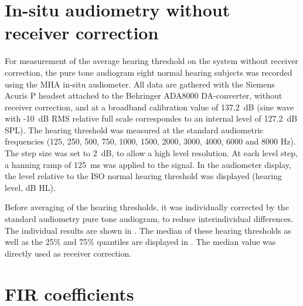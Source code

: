 \documentclass[11pt,a4paper,twoside]{article}
\begin{document}
\section{In-situ audiometry without receiver correction}

For measurement of the average hearing threshold on the system without
receiver correction, the pure tone audiogram eight normal hearing
subjects was recorded using the MHA in-situ audiometer.
%
All data are gathered with the Siemens Acuris P headset attached to
the Behringer ADA8000 DA-converter, without receiver correction, and
at a broadband calibration value of 137.2~dB (sine wave with -10~dB
RMS relative full scale correspondes to an internal level of 127.2~dB
SPL).
%
The hearing threshold was measured at the standard audiometric
frequencies (125, 250, 500, 750, 1000, 1500, 2000, 3000, 4000, 6000
and 8000 Hz).
%
The step size was set to 2~dB, to allow a high level resolution.
%
At each level step, a hanning ramp of 125~ms was applied to the
signal.
%
In the audiometer display, the level relative to the ISO normal
hearing threshold was displayed (hearing level, dB HL).

Before averaging of the hearing thresholds, it was individually
corrected by the standard audiometry pure tone audiogram, to reduce
interindividual differences.
%
The individual results are shown in .
%
The median of these hearing thresholds as well as the 25\% and 75\%
quantiles are displayed in .
%
The median value was directly used as receiver correction.



\section{FIR coefficients}
\end{document}
